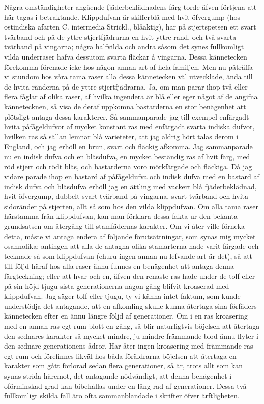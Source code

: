 Några omständigheter angående fjäderbeklädnadens färg torde äfven förtjena att här tagas i betraktande. Klippdufvan är skifferblå med hvit öfvergump (hos ostindiska afarten C. intermedia Strickl., blåaktig), har på stjertspetsen ett svart tvärband och på de yttre stjertfjädrarna en hvit yttre rand, och två svarta tvärband på vingarna; några halfvilda och andra såsom det synes fullkomligt vilda underraser hafva dessutom svarta fläckar å vingarna. Dessa kännetecken förekomma förenade icke hos någon annan art af hela familjen. Men nu påträffa vi stundom hos våra tama raser alla dessa kännetecken väl utvecklade, ända till de hvita ränderna på de yttre stjertfjädrarna. Ja, om man parar ihop två eller flera fåglar af olika raser, af hvilka ingendera är blå eller eger något af de angifna kännetecknen, så visa de deraf uppkomna bastarderna en stor benägenhet att plötsligt antaga dessa karakterer. Så sammanparade jag till exempel enfärgadt hvita påfågeldufvor af mycket konstant ras med enfärgadt svarta indiska dufvor, hvilken ras så sällan lemnar blå varieteter, att jag aldrig hört talas derom i England, och jag erhöll en brun, svart och fläckig afkomma. Jag sammanparade nu en indisk dufva och en bläsdufva, en mycket beständig ras af hvit färg, med röd stjert och rödt bläs, och bastarderna voro mörkfärgade och fläckiga. Då jag vidare parade ihop en bastard af påfågeldufva och indisk dufva med en bastard af indisk dufva och bläsdufva erhöll jag en ättling med vackert blå fjäderbeklädnad, hvit öfvergump, dubbelt svart tvärband på vingarna, svart tvärband och hvita sidoränder på stjerten, allt så som hos den vilda klippdufvan. Om alla tama raser härstamma från klippdufvan, kan man förklara dessa fakta ur den bekanta grundsatsen om återgång till stamfädernas karakter. Om vi åter ville förneka detta, måste vi antaga endera af följande förutsättningar, som synas mig mycket osannolika: antingen att alla de antagna olika stamarterna hade varit färgade och tecknade så som klippdufvan (ehuru ingen annan nu lefvande art är det), så att till följd häraf hos alla raser ännu funnes en benägenhet att antaga denna färgteckning; eller att hvar och en, äfven den renaste ras hade under de tolf eller på sin höjd tjugu sista generationerna någon gång blifvit kroaserad med klippdufvan. Jag säger tolf eller tjugu, ty vi känna intet faktum, som kunde understödja det antagande, att en afkomling skulle kunna återtaga sina förfäders kännetecken efter en ännu längre följd af generationer. Om i en ras kroasering med en annan ras egt rum blott en gång, så blir naturligtvis böjelsen att återtaga den sednares karakter så mycket mindre, ju mindre främmande blod ännu flyter i den sednare generationens ådror. Har åter ingen kroasering med främmande ras egt rum och förefinnes likväl hos båda föräldrarna böjelsen att återtaga en karakter som gått förlorad sedan flera generationer, så är, trots allt som kan synas strida häremot, det antagande nödvändigt, att denna benägenhet i oförminskad grad kan bibehållas under en lång rad af generationer. Dessa två fullkomligt skilda fall äro ofta sammanblandade i skrifter öfver ärftligheten.

